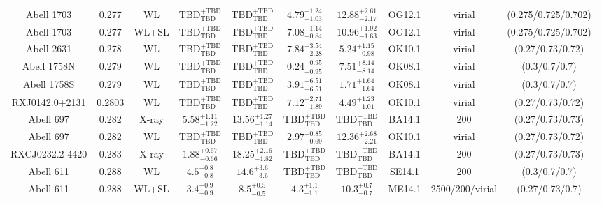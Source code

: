 \begin{table}
\begin{tabular}{cccccccccc}
Abell 1703 & 0.277 & WL & ${\mathrm{TBD}}^{+\mathrm{TBD}}_{\mathrm{TBD}}$ & ${\mathrm{TBD}}^{+\mathrm{TBD}}_{\mathrm{TBD}}$ & ${4.79}^{+1.24}_{-1.03}$ & ${12.88}^{+2.61}_{-2.17}$ & OG12.1 & virial & (0.275/0.725/0.702) \\
Abell 1703 & 0.277 & WL+SL & ${\mathrm{TBD}}^{+\mathrm{TBD}}_{\mathrm{TBD}}$ & ${\mathrm{TBD}}^{+\mathrm{TBD}}_{\mathrm{TBD}}$ & ${7.08}^{+1.14}_{-0.84}$ & ${10.96}^{+1.92}_{-1.63}$ & OG12.1 & virial & (0.275/0.725/0.702) \\
Abell 2631 & 0.278 & WL & ${\mathrm{TBD}}^{+\mathrm{TBD}}_{\mathrm{TBD}}$ & ${\mathrm{TBD}}^{+\mathrm{TBD}}_{\mathrm{TBD}}$ & ${7.84}^{+3.54}_{-2.28}$ & ${5.24}^{+1.15}_{-0.98}$ & OK10.1 & virial & (0.27/0.73/0.72) \\
Abell 1758N & 0.279 & WL & ${\mathrm{TBD}}^{+\mathrm{TBD}}_{\mathrm{TBD}}$ & ${\mathrm{TBD}}^{+\mathrm{TBD}}_{\mathrm{TBD}}$ & ${0.24}^{+0.95}_{-0.95}$ & ${7.51}^{+8.14}_{-8.14}$ & OK08.1 & virial & (0.3/0.7/0.7) \\
Abell 1758S & 0.279 & WL & ${\mathrm{TBD}}^{+\mathrm{TBD}}_{\mathrm{TBD}}$ & ${\mathrm{TBD}}^{+\mathrm{TBD}}_{\mathrm{TBD}}$ & ${3.91}^{+6.51}_{-6.51}$ & ${1.71}^{+1.64}_{-1.64}$ & OK08.1 & virial & (0.3/0.7/0.7) \\
RXJ0142.0+2131 & 0.2803 & WL & ${\mathrm{TBD}}^{+\mathrm{TBD}}_{\mathrm{TBD}}$ & ${\mathrm{TBD}}^{+\mathrm{TBD}}_{\mathrm{TBD}}$ & ${7.12}^{+2.71}_{-1.89}$ & ${4.49}^{+1.23}_{-1.01}$ & OK10.1 & virial & (0.27/0.73/0.72) \\
Abell 697 & 0.282 & X-ray & ${5.58}^{+1.11}_{-1.22}$ & ${13.56}^{+1.27}_{-1.14}$ & ${\mathrm{TBD}}^{+\mathrm{TBD}}_{\mathrm{TBD}}$ & ${\mathrm{TBD}}^{+\mathrm{TBD}}_{\mathrm{TBD}}$ & BA14.1 & 200 & (0.27/0.73/0.73) \\
Abell 697 & 0.282 & WL & ${\mathrm{TBD}}^{+\mathrm{TBD}}_{\mathrm{TBD}}$ & ${\mathrm{TBD}}^{+\mathrm{TBD}}_{\mathrm{TBD}}$ & ${2.97}^{+0.85}_{-0.69}$ & ${12.36}^{+2.68}_{-2.21}$ & OK10.1 & virial & (0.27/0.73/0.72) \\
RXCJ0232.2-4420 & 0.283 & X-ray & ${1.88}^{+0.67}_{-0.66}$ & ${18.25}^{+2.16}_{-1.82}$ & ${\mathrm{TBD}}^{+\mathrm{TBD}}_{\mathrm{TBD}}$ & ${\mathrm{TBD}}^{+\mathrm{TBD}}_{\mathrm{TBD}}$ & BA14.1 & 200 & (0.27/0.73/0.73) \\
Abell 611 & 0.288 & WL & ${4.5}^{+0.8}_{-0.8}$ & ${14.6}^{+3.6}_{-3.6}$ & ${\mathrm{TBD}}^{+\mathrm{TBD}}_{\mathrm{TBD}}$ & ${\mathrm{TBD}}^{+\mathrm{TBD}}_{\mathrm{TBD}}$ & SE14.1 & 200 & (0.3/0.7/0.7) \\
Abell 611 & 0.288 & WL+SL & ${3.4}^{+0.9}_{-0.9}$ & ${8.5}^{+0.5}_{-0.5}$ & ${4.3}^{+1.1}_{-1.1}$ & ${10.3}^{+0.7}_{-0.7}$ & ME14.1 & 2500/200/virial & (0.27/0.73/0.7) \\

\end{tabular}
\end{table}
